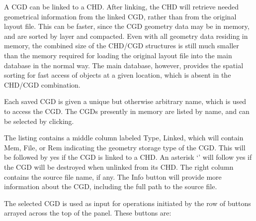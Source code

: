 A CGD can be linked to a CHD.  After linking, the CHD will retrieve
needed geometrical information from the linked CGD, rather than from
the original layout file.  This can be faster, since the CGD geometry
data may be in memory, and are sorted by layer and compacted.  Even
with all geometry data residing in memory, the combined size of the
CHD/CGD structures is still much smaller than the memory required for
loading the original layout file into the main database in the normal
way.  The main database, however, provides the spatial sorting for
fast access of objects at a given location, which is absent in the
CHD/CGD combination.

Each saved CGD is given a unique but otherwise arbitrary name, which
is used to access the CGD.  The CGDs presently in memory are listed by
name, and can be selected by clicking.

The listing contains a middle column labeled {\cb Type, Linked}, which
will contain {\cb Mem}, {\cb File}, or {\cb Rem} indicating the
geometry storage type of the CGD.  This will be followed by {\cb yes}
if the CGD is linked to a CHD.  An asterisk `{\cb *}' will follow {\cb
yes} if the CGD will be destroyed when unlinked from its CHD.  The
right column contains the source file name, if any.  The {\cb Info}
button will provide more information about the CGD, including the full
path to the source file.

The selected CGD is used as input for operations initiated by the row
of buttons arrayed across the top of the panel.  These buttons are:

